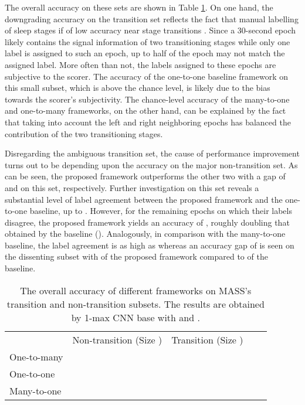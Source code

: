 \documentclass[10pt,twocolumn,twoside]{IEEEtran}
\begin{document}
The overall accuracy on these sets are shown in Table \ref{tab:performance_transition_nontransition}. On one hand, the downgrading accuracy on the transition set reflects the fact that manual labelling of sleep stages if of low accuracy near stage transitions \cite{Rosenberg2014}. Since a 30-second epoch likely contains the signal information of two transitioning stages while only one label is assigned to such an epoch, up to half of the epoch may not match the assigned label. More often than not, the labels assigned to these epochs are subjective to the scorer. The accuracy of the one-to-one baseline framework on this small subset, which is above the chance level, is likely due to the bias towards the scorer's subjectivity. The chance-level accuracy of the many-to-one and one-to-many frameworks, on the other hand, can be explained by the fact that taking into account the left and right neighboring epochs has balanced the contribution of the two transitioning stages.

Disregarding the ambiguous transition set, the cause of performance improvement turns out to be depending upon the accuracy on the major non-transition set. As can be seen, the proposed framework outperforms the other two with a gap of  and  on this set, respectively. Further investigation on this set reveals a substantial level of label agreement between the proposed framework and the one-to-one baseline, up to . However, for the remaining  epochs on which their labels disagree, the proposed framework yields an accuracy of , roughly doubling that obtained by the baseline (). Analogously, in comparison with the many-to-one baseline, the label agreement is as high as   whereas an accuracy gap of  is seen on the dissenting subset with  of the proposed framework compared to  of the baseline. 

\setlength\tabcolsep{2.5pt} \begin{table}[!b]
	\caption{The overall accuracy of different frameworks on MASS's transition and non-transition subsets. The results are obtained by 1-max CNN base with  and .}
	\footnotesize
	\vspace{-0.2cm}
	\begin{center}
		\begin{tabular}{|>{\arraybackslash}m{0.7in}|>{\centering\arraybackslash}m{0.65in}|>{\centering\arraybackslash}m{0.65in}|>{\centering\arraybackslash}m{0in} @{}m{0pt}@{}}
			\cline{2-3}
			\multicolumn{1}{c|}{} & Non-transition (Size ) & Transition (Size ) &  \parbox{0pt}{\rule{0pt}{2ex+\baselineskip}} \\ [0ex]  	
One-to-many  &  &  &  \parbox{0pt}{\rule{0pt}{0.5ex+\baselineskip}} \\ [0ex]  	One-to-one  &  &  &  \parbox{0pt}{\rule{0pt}{0.5ex+\baselineskip}} \\ [0ex]  	Many-to-one  & &  &  \parbox{0pt}{\rule{0pt}{0.5ex+\baselineskip}} \\ [0ex]  	
		\end{tabular}
	\end{center}
	\label{tab:performance_transition_nontransition}
\end{table}
\end{document}
